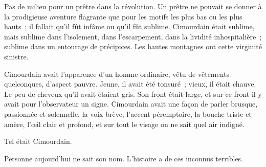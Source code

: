 \documentclass[french,twoside]{book} %
\begin{document}
Pas de milieu pour un prêtre dans la révolution. Un prêtre ne pouvait se donner à la prodigieuse aventure flagrante que pour les motifs les plus bas ou les plus hauts ; il fallait qu’il fût infâme ou qu’il fût sublime. Cimourdain était sublime, mais sublime dans l’isolement, dans l’escarpement, dans la lividité inhospitalière ; sublime dans un entourage de précipices. Les hautes montagnes ont cette virginité sinistre.\par
Cimourdain avait l’apparence d’un homme ordinaire, vêtu de vêtements quelconques, d’aspect pauvre. Jeune, il avait été tonsuré ; vieux, il était chauve. Le peu de cheveux qu’il avait étaient gris. Son front était large, et sur ce front il y avait pour l’observateur un signe. Cimourdain avait une façon de parler brusque, passionnée et solennelle, la voix brève, l’accent péremptoire, la bouche triste et amère, l’œil clair et profond, et sur tout le visage on ne sait quel air indigné.\par
Tel était Cimourdain.\par
Personne aujourd’hui ne sait son nom. L’histoire a de ces inconnus terribles.
\end{document}
